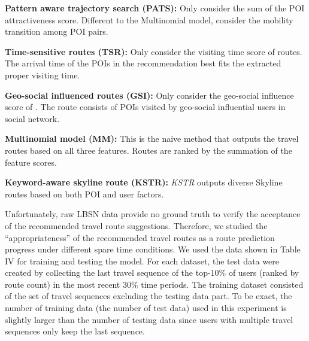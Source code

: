 \noindent\textbf{Pattern aware trajectory search (PATS):}
Only consider the sum of the POI attractiveness score. Different to the Multinomial model, \cite{PATS} consider the mobility transition among POI pairs.

\noindent\textbf{Time-sensitive routes (TSR):}
Only consider the visiting time score of routes. The arrival time of the POIs in the recommendation best fits the extracted proper visiting time.

\noindent\textbf{Geo-social influenced routes (GSI):}
Only consider the geo-social influence score of \cite{ytwen2014}. The route consists of POIs visited by geo-social influential users in social network.

\noindent\textbf{Multinomial model (MM):} 
This is the naive method that outputs the travel routes based on all three features. Routes are ranked by the summation of the feature scores. %

\noindent\textbf{Keyword-aware skyline route (KSTR):}
\textit{KSTR} outputs diverse Skyline routes based on both POI and user factors.

Unfortunately, raw LBSN data provide no ground truth to verify the acceptance of the recommended travel route suggestions. Therefore,
we studied the ``appropriateness'' of the recommended travel routes as a route prediction progress under different spare time conditions. We used the data shown in Table IV for training and testing the model. For each dataset, the test data were created by collecting the last travel sequence of the top-10\% of users (ranked by route count) in the most recent $30$\% time periods. The training dataset consisted of the set of travel sequences excluding the testing data part. To be exact, the number of training data (the number of test data) used in this experiment is slightly larger than the number of testing data since users with multiple travel sequences only keep the last sequence. 

